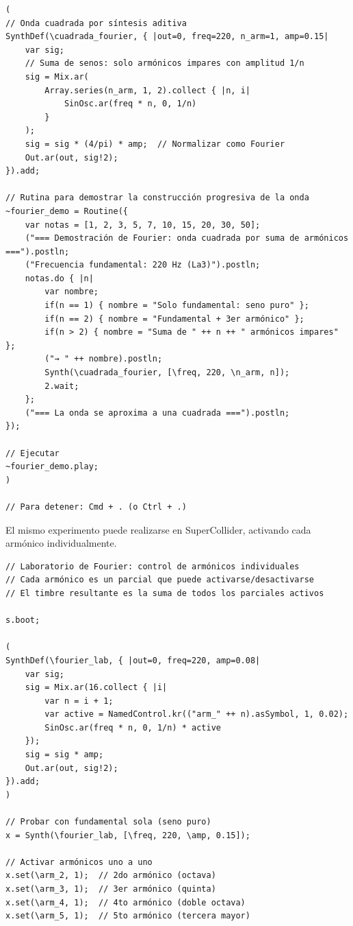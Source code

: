 \documentclass[14pt, a4paper]{article}
\begin{document}
\begin{enumerate}
\begin{verbatim}
(
// Onda cuadrada por síntesis aditiva
SynthDef(\cuadrada_fourier, { |out=0, freq=220, n_arm=1, amp=0.15|
    var sig;
    // Suma de senos: solo armónicos impares con amplitud 1/n
    sig = Mix.ar(
        Array.series(n_arm, 1, 2).collect { |n, i|
            SinOsc.ar(freq * n, 0, 1/n)
        }
    );
    sig = sig * (4/pi) * amp;  // Normalizar como Fourier
    Out.ar(out, sig!2);
}).add;

// Rutina para demostrar la construcción progresiva de la onda
~fourier_demo = Routine({
    var notas = [1, 2, 3, 5, 7, 10, 15, 20, 30, 50];
    ("=== Demostración de Fourier: onda cuadrada por suma de armónicos ===").postln;
    ("Frecuencia fundamental: 220 Hz (La3)").postln;
    notas.do { |n|
        var nombre;
        if(n == 1) { nombre = "Solo fundamental: seno puro" };
        if(n == 2) { nombre = "Fundamental + 3er armónico" };
        if(n > 2) { nombre = "Suma de " ++ n ++ " armónicos impares" };
        ("→ " ++ nombre).postln;
        Synth(\cuadrada_fourier, [\freq, 220, \n_arm, n]);
        2.wait;
    };
    ("=== La onda se aproxima a una cuadrada ===").postln;
});

// Ejecutar
~fourier_demo.play;
)

// Para detener: Cmd + . (o Ctrl + .)
\end{verbatim}

El mismo experimento puede realizarse en SuperCollider, activando
cada armónico individualmente.

\begin{verbatim}
// Laboratorio de Fourier: control de armónicos individuales
// Cada armónico es un parcial que puede activarse/desactivarse
// El timbre resultante es la suma de todos los parciales activos

s.boot;

(
SynthDef(\fourier_lab, { |out=0, freq=220, amp=0.08|
    var sig;
    sig = Mix.ar(16.collect { |i|
        var n = i + 1;
        var active = NamedControl.kr(("arm_" ++ n).asSymbol, 1, 0.02);
        SinOsc.ar(freq * n, 0, 1/n) * active
    });
    sig = sig * amp;
    Out.ar(out, sig!2);
}).add;
)

// Probar con fundamental sola (seno puro)
x = Synth(\fourier_lab, [\freq, 220, \amp, 0.15]);

// Activar armónicos uno a uno
x.set(\arm_2, 1);  // 2do armónico (octava)
x.set(\arm_3, 1);  // 3er armónico (quinta)
x.set(\arm_4, 1);  // 4to armónico (doble octava)
x.set(\arm_5, 1);  // 5to armónico (tercera mayor)


\end{verbatim}
\end{enumerate}
\end{document}
